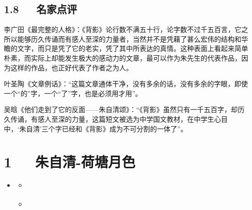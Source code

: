 \documentclass[letterpaper,10pt,english]{sphinxmanual}
\begin{document}
\section{1.8   名家点评}
\label{\detokenize{p01_u6563_u6587/_u6731_u81ea_u6e05-_u80cc_u5f71:id13}}
李广田《最完整的人格》：《背影》论行数不满五十行，论字数不过千五百言，它之所以能够历久传诵而有感人至深的力量者，当然并不是凭藉了甚么宏伟的结构和华瞻的文字，而只是凭了它的老实，凭了其中所表达的真情。这种表面上看起来简单朴素，而实际上却能发生极大的感动力的文章，最可以作为朱先生的代表作品，因为这样的作品，也正好代表了作者之为人。

叶圣陶《文章例话》：“这篇文章通体干净，没有多余的话，没有多余的字眼，即使一个“的”字，一个“了”字，也是必须用才用”。

吴晗《他们走到了它的反面——朱自清颂》：“《背影》虽然只有一千五百字，却历久传诵，有感人至深的力量，这篇短文被选为中学国文教材，在中学生心目中，‘朱自清’三个字已经和《背影》成为不可分割的一体了”。


\chapter{1   朱自清-荷塘月色}
\label{\detokenize{p01_u6563_u6587/_u6731_u81ea_u6e05-_u8377_u5858_u6708_u8272:id1}}\label{\detokenize{p01_u6563_u6587/_u6731_u81ea_u6e05-_u8377_u5858_u6708_u8272::doc}}
\begin{sphinxShadowBox}
\begin{itemize}
\item {} 
\label{\detokenize{p01_u6563_u6587/_u6731_u81ea_u6e05-_u8377_u5858_u6708_u8272:id5}}{\hyperref[\detokenize{p01_u6563_u6587/_u6731_u81ea_u6e05-_u8377_u5858_u6708_u8272:id1}]{}}
\begin{itemize}
\item {} 
\label{\detokenize{p01_u6563_u6587/_u6731_u81ea_u6e05-_u8377_u5858_u6708_u8272:id6}}{\hyperref[\detokenize{p01_u6563_u6587/_u6731_u81ea_u6e05-_u8377_u5858_u6708_u8272:id3}]{}}

\item {} 
\label{\detokenize{p01_u6563_u6587/_u6731_u81ea_u6e05-_u8377_u5858_u6708_u8272:id7}}{\hyperref[\detokenize{p01_u6563_u6587/_u6731_u81ea_u6e05-_u8377_u5858_u6708_u8272:id4}]{}}

\end{itemize}

\end{itemize}
\end{sphinxShadowBox}
\end{document}
